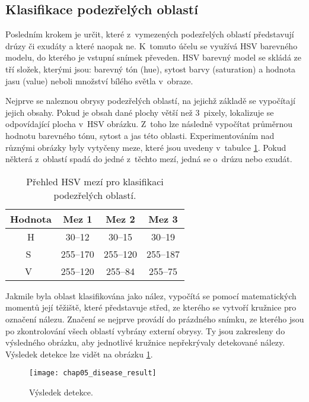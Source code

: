 \subsection*{Klasifikace podezřelých oblastí}
Posledním krokem je určit, které z~vymezených podezřelých oblastí představují drúzy či exudáty a které naopak ne. K~tomuto účelu se využívá HSV barevného modelu, do kterého je vstupní snímek převeden. HSV barevný model se skládá ze tří složek, kterými jsou: barevný tón (hue), sytost barvy (saturation) a hodnota jasu (value) neboli množství bílého světla v~obraze.

Nejprve se naleznou obrysy podezřelých oblastí, na jejichž základě se vypočítají jejich obsahy. Pokud je obsah dané plochy větší než 3~pixely, lokalizuje se odpovídající plocha v~HSV obrázku. Z~toho lze následně vypočítat průměrnou hodnotu barevného tónu, sytost a jas této oblasti. Experimentováním nad různými obrázky byly vytyčeny meze, které jsou uvedeny v~tabulce \ref{tab:hsv_color_limits}. Pokud některá z~oblastí spadá do jedné z~těchto mezí, jedná se o~drúzu nebo exudát.

\begin{table}[ht]
  \begin{center}	
    \begin{tabular}{|c|c|c|c|}
      \hline
      Hodnota & Mez 1 & Mez 2   & Mez 3 \\
      \hline
      H & 30--12   &  30--15 &  30--19 \\
      \hline
      S~& 255--170 & 255--120 & 255--187 \\
      \hline
      V~& 255--120 & 255--84 & 255--75 \\
      \hline
    \end{tabular}
  \caption{Přehled HSV mezí pro klasifikaci podezřelých oblastí.}
  \label{tab:hsv_color_limits}
  \end{center}
\end{table}

Jakmile byla oblast klasifikována jako nález, vypočítá se pomocí matematických momentů její těžiště, které představuje střed, ze kterého se vytvoří kružnice pro označení nálezu. Značení se nejprve provádí do prázdného snímku, ze kterého jsou po zkontrolování všech oblastí vybrány externí obrysy. Ty jsou zakresleny do výsledného obrázku, aby jednotlivé kružnice nepřekrývaly detekované nálezy. Výsledek detekce lze vidět na obrázku \ref{pic:chap05_disease_result}.

\begin{figure}[h]
  \begin{center}
    \texttt{[image: chap05\_disease\_result]}
    \caption{Výsledek detekce.}
    \label{pic:chap05_disease_result}
  \end{center}
\end{figure}


